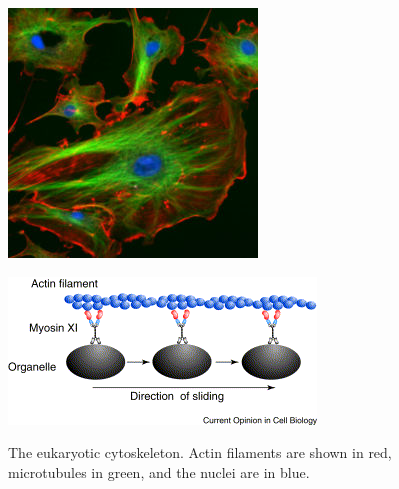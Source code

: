 \documentclass{../lab}
\begin{document}
\begin{figure}[h]
\begin{minipage}{0.32\linewidth}
\centering
\href{http://experimentationlab.berkeley.edu/sites/default/files/images/250px-BMC_Cytoskeleton.jpg}{\includegraphics[width=\linewidth]{images/250px-BMC_Cytoskeleton.jpg}}
    \caption{The eukaryotic cytoskeleton. Actin filaments are shown in red, microtubules in green, and the nuclei are in blue.}
    \label{fig:250px-BMC_Cytoskeleton}
    \end{minipage}\hfill
\begin{minipage}{0.32\linewidth}
    \centering
    \href{http://experimentationlab.berkeley.edu/sites/default/files/images/Myosin.gif}{\includegraphics[width=\linewidth,keepaspectratio]{images/Myosin.png}} \\

\end{minipage}
\end{figure}
\end{document}
